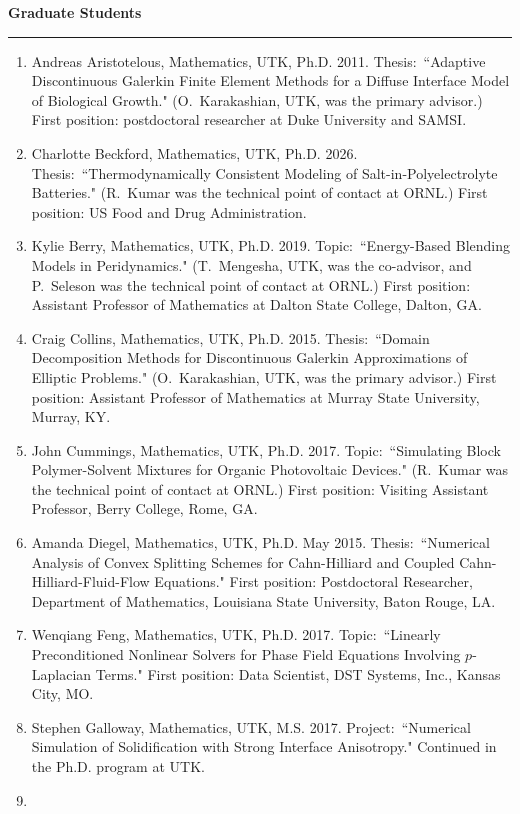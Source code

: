\documentclass[10pt,letterpaper]{article}
\newcommand{\cvsection}[1]{%
  \Needspace{5\baselineskip}\par\vspace{13pt}%
  {\color{Smokey}\fontsize{15}{17}\selectfont\bfseries #1}\par\vspace{3pt}%
  {\color{UTOrange}\rule{\linewidth}{1.8pt}}\par\vspace{4pt}%
}
\newcommand{\cvsubsection}[1]{%
  \par\vspace{8pt}{\color{Smokey}\fontsize{12}{14}\selectfont\bfseries #1}\par\vspace{2pt}%
}
\begin{document}
\cvsection{Graduate Students}
\cvsubsection{Former (Alphabetical by Last Name)}
	\begin{enumerate}[itemsep=3pt,topsep=3pt]
	\item
Andreas Aristotelous, Mathematics, UTK, Ph.D. 2011. Thesis:~``Adaptive Discontinuous Galerkin Finite Element Methods for a Diffuse Interface Model of Biological Growth." (O.~Karakashian, UTK, was the primary advisor.) First position: postdoctoral researcher at Duke University and SAMSI.
	\item
Charlotte Beckford, Mathematics, UTK, Ph.D. 2026. Thesis:~``Thermodynamically Consistent Modeling of Salt-in-Polyelectrolyte Batteries." (R.~Kumar was the technical point of contact at ORNL.) First position: US Food and Drug Administration.
	\item
Kylie Berry, Mathematics, UTK, Ph.D. 2019. Topic:~``Energy-Based Blending Models in Peridynamics." (T.~Mengesha, UTK, was the co-advisor, and P.~Seleson was the technical point of contact at ORNL.) First position: Assistant Professor of Mathematics at Dalton State College, Dalton, GA.
	\item
Craig Collins, Mathematics, UTK, Ph.D. 2015. Thesis:~``Domain Decomposition Methods for Discontinuous Galerkin Approximations of Elliptic Problems." (O.~Karakashian, UTK, was the primary advisor.) First position: Assistant Professor of Mathematics at Murray State University, Murray, KY.
	\item
John Cummings, Mathematics, UTK, Ph.D. 2017. Topic:~``Simulating Block Polymer-Solvent Mixtures for Organic Photovoltaic Devices." (R.~Kumar was the technical point of contact at ORNL.) First position: Visiting Assistant Professor, Berry College, Rome, GA.
	\item
Amanda Diegel, Mathematics, UTK, Ph.D. May 2015. Thesis:~``Numerical Analysis of Convex Splitting Schemes for Cahn-Hilliard and Coupled Cahn-Hilliard-Fluid-Flow Equations." First position: Postdoctoral Researcher, Department of Mathematics, Louisiana State University, Baton Rouge, LA.
	\item
Wenqiang Feng, Mathematics, UTK, Ph.D. 2017. Topic:~``Linearly Preconditioned Nonlinear Solvers for Phase Field Equations Involving $p$-Laplacian Terms." First position: Data Scientist, DST Systems, Inc., Kansas City, MO.
	\item
Stephen Galloway, Mathematics, UTK, M.S. 2017. Project:~``Numerical Simulation of Solidification with Strong Interface Anisotropy." Continued in the Ph.D. program at UTK.
	\item

\end{enumerate}
\end{document}
